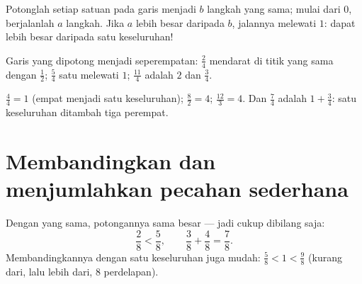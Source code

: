 \begin{method}\label{met:g4:fractions:line}
Potonglah setiap satuan pada garis menjadi $b$ langkah yang sama;
mulai dari $0$, berjalanlah $a$ langkah. Jika $a$ lebih besar
daripada $b$, jalannya melewati $1$:  dapat lebih besar
daripada satu keseluruhan!
\end{method}

\begin{omfigure}

{\small Garis yang dipotong menjadi seperempatan: $\frac24$ mendarat
di titik yang sama dengan $\frac12$; $\frac54$ satu 
melewati $1$; $\frac{11}{4}$ adalah $2$ dan $\frac34$.}
\end{omfigure}

\begin{example}\label{ex:g4:fractions:whole}
$\frac44 = 1$ (empat  menjadi satu keseluruhan);
$\frac82 = 4$; $\frac{12}{3} = 4$. Dan $\frac74$ adalah
$1 + \frac34$: satu keseluruhan ditambah tiga perempat.
\end{example}

\section{Membandingkan dan menjumlahkan pecahan sederhana}

\begin{proposition}\label{prop:g4:fractions:compare}
Dengan  yang sama, potongannya sama besar --- jadi cukup
dibilang saja:
\[
\frac{2}{8} < \frac{5}{8},
\qquad
\frac{3}{8} + \frac{4}{8} = \frac{7}{8}.
\]
Membandingkannya dengan satu keseluruhan juga mudah: $\frac{5}{8} < 1 < \frac{9}{8}$
(kurang dari, lalu lebih dari, $8$ perdelapan).
\end{proposition}

